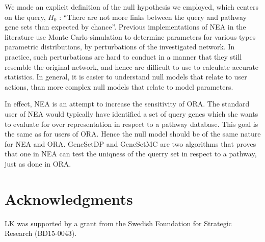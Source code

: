 \documentclass[10pt,letterpaper]{article}
\begin{document}
We made an explicit definition of the null hypothesis we employed, which centers on the query, $H_0$ : ``There are not more links between the query and pathway gene sets than expected by chance''. Previous implementations of NEA in the literature use Monte Carlo-simulation to determine parameters for various types parametric distributions, by perturbations of the investigated network. In practice, such perturbations are hard to conduct in a manner that they still resemble the original network, and hence are difficult to use to calculate accurate statistics. In general, it is easier to understand null models that relate to user actions, than more complex null models that relate to model parameters.

In effect, NEA is an attempt to increase the sensitivity of ORA. The standard user of NEA would typically have identified a set of query genes which she wants to evaluate for over representation in respect to a pathway database. This goal is the same as for users of ORA. Hence the null model should be of the same nature for NEA and ORA. GeneSetDP and GeneSetMC are two algorithms that proves that one in NEA can test the uniqness of the querry set in respect to a pathway, just as done in ORA.

\section*{Acknowledgments}

LK was supported by a grant from the Swedish Foundation for Strategic Research (BD15-0043).


\end{document}

